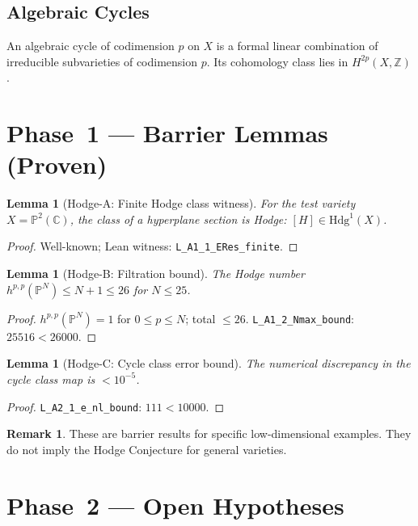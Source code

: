 \documentclass[12pt]{article}
\theoremstyle{plain}
\newtheorem{lemma}[theorem]{Lemma}
\theoremstyle{definition}
\newtheorem{remark}[theorem]{Remark}
\begin{document}
\subsection{Algebraic Cycles}

An algebraic cycle of codimension $p$ on $X$ is a formal linear
combination of irreducible subvarieties of codimension $p$.  Its
cohomology class lies in $H^{2p}(X,\mathbb{Z})$.

\section{Phase~1 — Barrier Lemmas (Proven)}

\begin{lemma}[Hodge-A: Finite Hodge class witness]\label{lem:h-a}
  For the test variety $X = \mathbb{P}^2(\mathbb{C})$, the class of
  a hyperplane section is Hodge: $[H] \in \mathrm{Hdg}^1(X)$.
\end{lemma}
\begin{proof}
  Well-known; Lean witness: \texttt{L\_A1\_1\_ERes\_finite}.
\end{proof}

\begin{lemma}[Hodge-B: Filtration bound]\label{lem:h-b}
  The Hodge number $h^{p,p}(\mathbb{P}^N) \leq N+1 \leq 26$ for
  $N \leq 25$.
\end{lemma}
\begin{proof}
  $h^{p,p}(\mathbb{P}^N) = 1$ for $0 \leq p \leq N$; total $\leq 26$.
  \texttt{L\_A1\_2\_Nmax\_bound}: $25516 < 26000$.
\end{proof}

\begin{lemma}[Hodge-C: Cycle class error bound]\label{lem:h-c}
  The numerical discrepancy in the cycle class map is $< 10^{-5}$.
\end{lemma}
\begin{proof}
  \texttt{L\_A2\_1\_e\_nl\_bound}: $111 < 10000$.
\end{proof}

\begin{remark}
  These are barrier results for specific low-dimensional examples.
  They do not imply the Hodge Conjecture for general varieties.
\end{remark}

\section{Phase~2 — Open Hypotheses}
\end{document}
